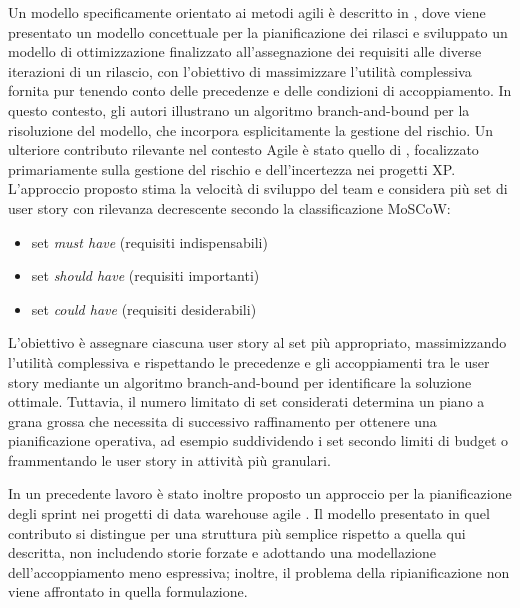 \documentclass[12pt,a4paper,openright,twoside]{book}
\begin{document}
\vspace{1em}

Un modello specificamente orientato ai metodi agili è descritto in \cite{SZOKE2011574}, dove viene presentato un modello concettuale per la pianificazione dei rilasci e sviluppato un modello di ottimizzazione finalizzato all’assegnazione dei requisiti alle diverse iterazioni di un rilascio, con l’obiettivo di massimizzare l’utilità complessiva fornita pur tenendo conto delle precedenze e delle condizioni di accoppiamento. In questo contesto, gli autori illustrano un algoritmo branch-and-bound per la risoluzione del modello, che incorpora esplicitamente la gestione del rischio. Un ulteriore contributo rilevante nel contesto Agile è stato quello di \cite{VANVALKENHOEF20111227}, focalizzato primariamente sulla gestione del rischio e dell’incertezza nei progetti XP. L’approccio proposto stima la velocità di sviluppo del team e considera più set di user story con rilevanza decrescente secondo la classificazione MoSCoW:

\begin{itemize}
\item set \textit{must have} (requisiti indispensabili)
\item set \textit{should have} (requisiti importanti)
\item set \textit{could have} (requisiti desiderabili)
\end{itemize}
L’obiettivo è assegnare ciascuna user story al set più appropriato, massimizzando l’utilità complessiva e rispettando le precedenze e gli accoppiamenti tra le user story mediante un algoritmo branch-and-bound per identificare la soluzione ottimale. Tuttavia, il numero limitato di set considerati determina un piano a grana grossa che necessita di successivo raffinamento per ottenere una pianificazione operativa, ad esempio suddividendo i set secondo limiti di budget o frammentando le user story in attività più granulari.

In un precedente lavoro è stato inoltre proposto un approccio per la pianificazione degli sprint nei progetti di data warehouse agile \cite{inproceedings}. Il modello presentato in quel contributo si distingue per una struttura più semplice rispetto a quella qui descritta, non includendo storie forzate e adottando una modellazione dell’accoppiamento meno espressiva; inoltre, il problema della ripianificazione non viene affrontato in quella formulazione.

\vspace{1em}
\end{document}
